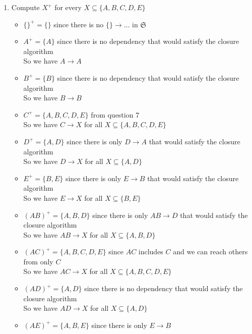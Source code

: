 \documentclass[12pt]{article}
\begin{document}
\begin{enumerate}
  \item Compute $X^+$ for every $X \subseteq \{A, B, C, D, E\}$
        \begin{itemize}
          \item $\{\}^+ = \{\}$ since there is no $\{\} \longrightarrow \dots$
                in $\mathfrak{S}$
          \item $A^+ = \{A\}$ since there is no dependency that would satisfy
                the closure algorithm \\
                So we have $A \longrightarrow A$
          \item $B^+ = \{B\}$ since there is no dependency that would satisfy
                the closure algorithm \\
                So we have $B \longrightarrow B$
          \item $C^+ = \{A, B, C, D, E\}$ from question 7 \\
                So we have $C \longrightarrow X$ for all $X \subseteq \{A, B, C,
                D, E\}$
          \item $D^+ = \{A, D\}$ since there is only $D \longrightarrow A$ that
                would satisfy the closure algorithm \\
                So we have $D \longrightarrow X$ for all $X \subseteq \{A, D\}$
          \item $E^+ = \{B, E\}$ since there is only $E \longrightarrow B$ that
                would satisfy the closure algorithm \\
                So we have $E \longrightarrow X$ for all $X \subseteq \{B, E\}$
          \item $(AB)^+ = \{A, B, D\}$ since there is only $AB \longrightarrow
                D$ that would satisfy the closure algorithm \\
                So we have $AB \longrightarrow X$ for all $X \subseteq \{A, B,
                D\}$
          \item $(AC)^+ = \{A, B, C, D, E\}$ since $AC$ includes $C$ and we can
                reach others from only $C$ \\
                So we have $AC \longrightarrow X$ for all $X \subseteq \{A, B,
                C, D, E\}$
          \item $(AD)^+ = \{A, D\}$ since there is no dependency that would
                satisfy the closure algorithm \\
                So we have $AD \longrightarrow X$ for all $X \subseteq \{A, D\}$
          \item $(AE)^+ = \{A, B, E\}$ since there is only $E \longrightarrow B$

\end{itemize}
\end{enumerate}
\end{document}
